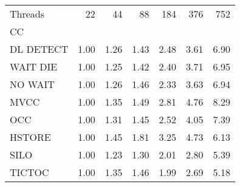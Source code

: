 \begin{tabular}{lrrrrrr}
\toprule
Threads &  22  &  44  &  88  &  184 &  376 &  752 \\
CC        &      &      &      &      &      &      \\
\midrule
DL DETECT & 1.00 & 1.26 & 1.43 & 2.48 & 3.61 & 6.90 \\
WAIT DIE  & 1.00 & 1.25 & 1.42 & 2.40 & 3.71 & 6.95 \\
NO WAIT   & 1.00 & 1.26 & 1.46 & 2.33 & 3.63 & 6.94 \\
MVCC      & 1.00 & 1.35 & 1.49 & 2.81 & 4.76 & 8.29 \\
OCC       & 1.00 & 1.31 & 1.45 & 2.52 & 4.05 & 7.39 \\
HSTORE    & 1.00 & 1.45 & 1.81 & 3.25 & 4.73 & 6.13 \\
SILO      & 1.00 & 1.23 & 1.30 & 2.01 & 2.80 & 5.39 \\
TICTOC    & 1.00 & 1.35 & 1.46 & 1.99 & 2.69 & 5.18 \\
\bottomrule
\end{tabular}

